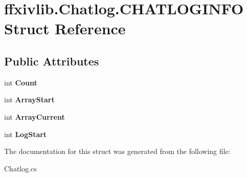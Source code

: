 \hypertarget{structffxivlib_1_1_chatlog_1_1_c_h_a_t_l_o_g_i_n_f_o}{\section{ffxivlib.\-Chatlog.\-C\-H\-A\-T\-L\-O\-G\-I\-N\-F\-O Struct Reference}
\label{structffxivlib_1_1_chatlog_1_1_c_h_a_t_l_o_g_i_n_f_o}
}
\subsection*{Public Attributes}
\begin{DoxyCompactItemize}
\item 
\hypertarget{structffxivlib_1_1_chatlog_1_1_c_h_a_t_l_o_g_i_n_f_o_afa2df40c7d0bba61ff5f1dbd122603b7}{int {\bfseries Count}}\label{structffxivlib_1_1_chatlog_1_1_c_h_a_t_l_o_g_i_n_f_o_afa2df40c7d0bba61ff5f1dbd122603b7}

\item 
\hypertarget{structffxivlib_1_1_chatlog_1_1_c_h_a_t_l_o_g_i_n_f_o_a3d587c9a7611229371f23b87ee45f3a6}{int {\bfseries Array\-Start}}\label{structffxivlib_1_1_chatlog_1_1_c_h_a_t_l_o_g_i_n_f_o_a3d587c9a7611229371f23b87ee45f3a6}

\item 
\hypertarget{structffxivlib_1_1_chatlog_1_1_c_h_a_t_l_o_g_i_n_f_o_a56920e90722b86ba1b4f1ab4ea7bf66a}{int {\bfseries Array\-Current}}\label{structffxivlib_1_1_chatlog_1_1_c_h_a_t_l_o_g_i_n_f_o_a56920e90722b86ba1b4f1ab4ea7bf66a}

\item 
\hypertarget{structffxivlib_1_1_chatlog_1_1_c_h_a_t_l_o_g_i_n_f_o_a082f1bacd2b48d50ad1c193d47285d14}{int {\bfseries Log\-Start}}\label{structffxivlib_1_1_chatlog_1_1_c_h_a_t_l_o_g_i_n_f_o_a082f1bacd2b48d50ad1c193d47285d14}

\end{DoxyCompactItemize}


The documentation for this struct was generated from the following file\-:\begin{DoxyCompactItemize}
\item 
Chatlog.\-cs\end{DoxyCompactItemize}
